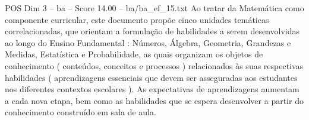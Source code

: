 \begin{textsample}{POS Dim 3 – ba – Score 14.00 – ba/ba\_ef\_15.txt}
Ao tratar da Matemática como componente curricular, este documento propõe cinco unidades temáticas correlacionadas, que orientam a formulação de habilidades a serem desenvolvidas ao longo do Ensino Fundamental : Números, Álgebra, Geometria, Grandezas e Medidas, Estatística e Probabilidade, as quais organizam os objetos de conhecimento ( conteúdos, conceitos e processos ) relacionados às suas respectivas habilidades ( aprendizagens essenciais que devem ser asseguradas aos estudantes nos diferentes contextos escolares ).
As expectativas de aprendizagens aumentam a cada nova etapa, bem como as habilidades que se espera desenvolver a partir do conhecimento construído em sala de aula.

\end{textsample}
